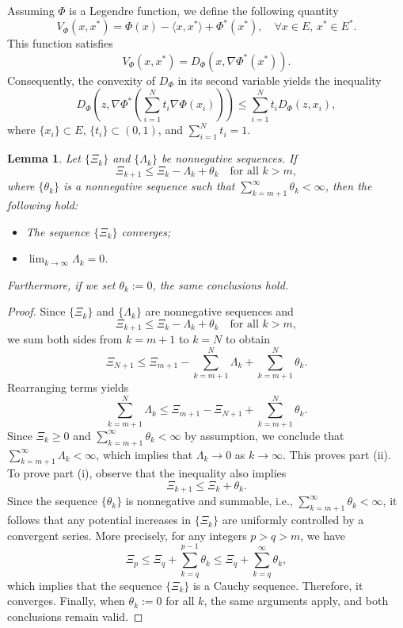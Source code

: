 \documentclass[hidelinks,11 pt]{article}
\numberwithin{equation}{section}
\newtheorem{lemma}[theorem]{Lemma}
\theoremstyle{definition}  %
\numberwithin{equation}{section}
\numberwithin{theorem}{section}
\begin{document}
\vskip 2mm
Assuming \( \Phi \) is a Legendre function, we define the following quantity
\[
V_\Phi(x, x^*) = \Phi(x) - \langle x, x^* \rangle + \Phi^*(x^*), \quad \forall x \in E, \, x^* \in E^*.
\]
This function satisfies
\[
V_\Phi(x, x^*) = D_\Phi(x, \nabla \Phi^*(x^*)).
\]
Consequently, the convexity of \( D_\Phi \) in its second variable yields the inequality
\begin{equation}\label{bregman_jensen}
D_\Phi\left(z, \nabla \Phi^*\left( \sum_{i=1}^N t_i \nabla \Phi(x_i) \right)\right) \leq \sum_{i=1}^N t_i D_\Phi(z, x_i),
\end{equation}
where \( \{x_i\} \subset E \), \( \{t_i\} \subset (0,1) \), and \( \sum_{i=1}^N t_i = 1 \).

\vskip 2mm
\begin{lemma}\label{l2.7}
Let $\{\Xi_k\}$ and $\{\Lambda_k\}$ be nonnegative sequences. If
\[
\Xi_{k+1} \leq \Xi_k - \Lambda_k + \theta_k \quad \text{for all } k > m,
\]
where $\{\theta_k\}$ is a nonnegative sequence such that $\sum_{k=m+1}^{\infty} \theta_k < \infty$, then the following hold:
\begin{itemize}
    \item[(i)] The sequence $\{\Xi_k\}$ converges;
    \item[(ii)] $\lim_{k \to \infty} \Lambda_k = 0$.
\end{itemize}

Furthermore, if we set $\theta_k := 0$, the same conclusions hold.
\end{lemma}
\begin{proof}
Since $\{\Xi_k\}$ and $\{\Lambda_k\}$ are nonnegative sequences and
\[
\Xi_{k+1} \leq \Xi_k - \Lambda_k + \theta_k \quad \text{for all } k > m,
\]
we sum both sides from $k = m+1$ to $k = N$ to obtain
\[
\Xi_{N+1} \leq \Xi_{m+1} - \sum_{k=m+1}^{N} \Lambda_k + \sum_{k=m+1}^{N} \theta_k.
\]
Rearranging terms yields
\[
\sum_{k=m+1}^{N} \Lambda_k \leq \Xi_{m+1} - \Xi_{N+1} + \sum_{k=m+1}^{N} \theta_k.
\]
Since $\Xi_k \geq 0$ and $\sum_{k=m+1}^{\infty} \theta_k < \infty$ by assumption, we conclude that $\sum_{k=m+1}^{\infty} \Lambda_k < \infty$,
which implies that $\Lambda_k \to 0$ as $k \to \infty$. This proves part (ii).
\vskip 2mm 
To prove part (i), observe that the inequality also implies
\[
\Xi_{k+1} \leq \Xi_k + \theta_k.
\]
Since the sequence $\{\theta_k\}$ is nonnegative and summable, i.e., $\sum_{k=m+1}^\infty \theta_k < \infty$, it follows that any potential increases in $\{\Xi_k\}$ are uniformly controlled by a convergent series. More precisely, for any integers $p > q > m$, we have
\[
\Xi_p \leq \Xi_q + \sum_{k=q}^{p-1} \theta_k \leq \Xi_q + \sum_{k=q}^{\infty} \theta_k,
\]
which implies that the sequence $\{\Xi_k\}$ is a Cauchy sequence. Therefore, it converges.
\vskip 2mm 
Finally, when $\theta_k := 0$ for all $k$, the same arguments apply, and both conclusions remain valid.
\end{proof}
\end{document}
